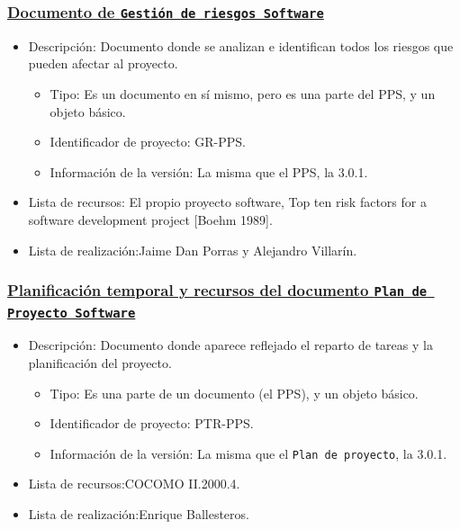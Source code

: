 \documentclass[spanish,a4paper,11pt, twoside]{report}	%
\begin{document}
			\subsubsection{\underline{Documento de \texttt{Gestión de riesgos Software}}}
			\begin{itemize}	
				\item{Descripción:} Documento donde se analizan e identifican todos los riesgos que pueden afectar al proyecto.
					\begin{itemize}	
						\item{Tipo:} Es un documento en sí mismo, pero es una parte del PPS, y un objeto básico.
						\item{Identificador de proyecto:} GR-PPS.
						\item{Información de la versión:} La misma que el PPS, la 3.0.1.
					\end{itemize}	
				\item{Lista de recursos:} El propio proyecto software, Top ten risk factors for a software development project [Boehm 1989].
				\item{Lista de realización:}Jaime Dan Porras y Alejandro Villarín.
			\end{itemize}		

			\subsubsection{\underline{Planificación temporal y recursos del documento \texttt{Plan de Proyecto Software}}}
			\begin{itemize}	
				\item{Descripción:} Documento donde aparece reflejado el reparto de tareas y la planificación del proyecto.
					\begin{itemize}	
						\item{Tipo:} Es una parte de un documento (el PPS), y un objeto básico.
						\item{Identificador de proyecto:} PTR-PPS.
						\item{Información de la versión:} La misma que el \texttt{Plan de proyecto}, la 3.0.1.
					\end{itemize}	
				\item{Lista de recursos:}COCOMO II.2000.4.
				\item{Lista de realización:}Enrique Ballesteros.
			\end{itemize}	
\end{document}
